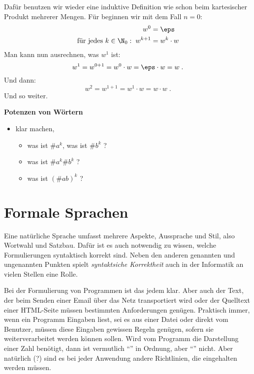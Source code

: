 Dafür benutzen wir wieder eine induktive Definition wie schon beim
kartesischer Produkt mehrerer Mengen. Für  beginnen
wir mit dem Fall $n=0$:
%
\begin{align*}
  w^0 &= \eps \\
  \text{für jedes } k\in\N_0:\; w^{k+1} &= w^k \cdot w
\end{align*}
%
Man kann nun ausrechnen, was $w^1$ ist:
\[
w^1 = w^{0+1} = w^0 \cdot w = \eps \cdot w = w \;.
\]
Und dann:
\[
w^2 = w^{1+1} = w^1 \cdot w = w \cdot w \;.
\]
Und so weiter.
%

\begin{tutorium}
  \textbf{Potenzen von Wörtern}

  \begin{itemize}
  \item klar machen,
    \begin{itemize}
    \item was ist $\#a^k$, was ist $\#b^k$ ?
    \item was ist $\#a^k\#b^k$ ?
    \item was ist $(\#{ab})^k$ ?
    \end{itemize}
  \end{itemize}
\end{tutorium}
\Tut\section{Formale Sprachen}

Eine natürliche Sprache umfasst mehrere Aspekte, \zB Aussprache und Stil, also
\zB Wortwahl und Satzbau. Dafür ist es auch notwendig zu wissen, welche
Formulierungen syntaktisch korrekt sind.
%
Neben den anderen genannten und ungenannten Punkten spielt
\emph{syntaktsiche Korrektheit} auch in der Informatik an vielen
Stellen eine Rolle.

Bei der Formulierung von Programmen ist das jedem klar.
%
Aber auch der Text, der beim Senden einer Email über das Netz
transportiert wird oder der Quelltext einer HTML-Seite müssen
bestimmten Anforderungen genügen.
%
Praktisch immer, wenn ein Programm Eingaben liest, sei es aus einer
Datei oder direkt vom Benutzer, müssen diese Eingaben gewissen Regeln
genügen, sofern sie weiterverarbeitet werden können sollen.
%
Wird \zB vom Programm die Darstellung einer Zahl benötigt, dann ist
vermutlich "`"' in Ordnung, aber "`"'
nicht.
%
Aber natürlich (?) sind es bei jeder Anwendung andere Richtlinien, die
eingehalten werden müssen.

